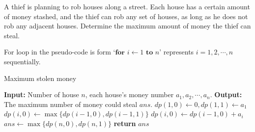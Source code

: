 \problem{}
A thief is planning to rob houses along a street. Each house has a certain amount of money stashed, and the thief can rob any set of houses, as long as he does not rob any adjacent houses.  Determine the maximum amount of money the thief can steal.

\solution{}



For loop in the pseudo-code is form `$\textbf{for } i \gets 1 \textbf{ to } n$' represents $i=1,2,\cdots,n$ sequentially.
\begin{algorithm}
    \caption{Maximum stolen money}\label{alg:problem-3}
    \begin{algorithmic}[1]
    \State \textbf{Input:} Number of house $n$, each house's money number $a_1, a_2, \cdots, a_n$. 
    \State \textbf{Output:} The maximum number of money could steal $ans$.
    \State $dp(1,0) \gets 0, dp(1,1)\gets a_1$
        \State $dp(i,0) \gets \max\{dp(i-1,0),dp(i-1,1)\}$
        \State $dp(i,0) \gets dp(i-1,0)+a_i$
    \EndFor
    \State $ans \gets \max\{dp(n,0),dp(n,1)\}$
    \State \textbf{return} $ans$
    \end{algorithmic}
\end{algorithm}





\newpage